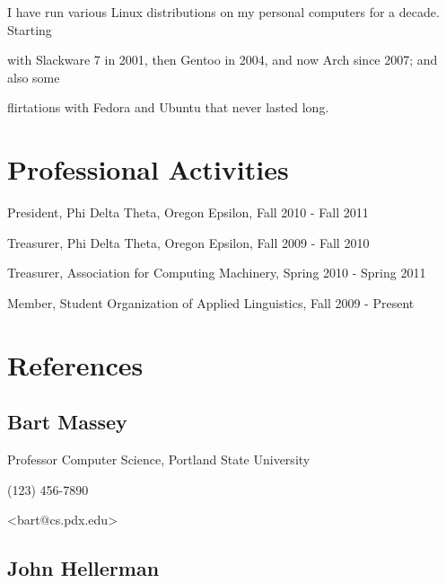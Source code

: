 \documentclass[10pt,letterpaper]{article}
\renewenvironment{itemize}{
  \begin{list}{}{
    \setlength{\leftmargin}{1.5em}
    \setlength{\itemsep}{0em}
    \setlength{\parskip}{0pt}
    \setlength{\parsep}{0em}
  }
}{
  \end{list}
}
\begin{document}
\begin{itemize}

    \item I have run various Linux distributions on my personal computers for a decade.  Starting
    \item with Slackware 7 in 2001, then Gentoo in 2004, and now Arch since 2007; and also some
    \item flirtations with Fedora and Ubuntu that never lasted long.

\end{itemize}

\section*{Professional Activities}

\begin{itemize}

	\item President, Phi Delta Theta, Oregon Epsilon, Fall 2010 - Fall 2011
	\item Treasurer, Phi Delta Theta, Oregon Epsilon, Fall 2009 - Fall 2010
	\item Treasurer, Association for Computing Machinery, Spring 2010 - Spring 2011
	\item Member, Student Organization of Applied Linguistics, Fall 2009 - Present

\end{itemize}

\section*{References}

\subsection*{Bart Massey}

\begin{itemize}
	
	\item Professor Computer Science, Portland State University
	\item (123) 456-7890
	\item <bart@cs.pdx.edu>	
	
\end{itemize}

\subsection*{John Hellerman}
\end{document}
